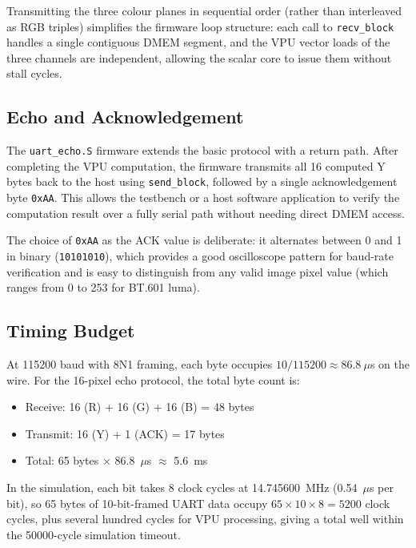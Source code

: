Transmitting the three colour planes in sequential order (rather than interleaved as
RGB triples) simplifies the firmware loop structure: each call to \texttt{recv\_block}
handles a single contiguous DMEM segment, and the VPU vector loads of the three channels
are independent, allowing the scalar core to issue them without stall cycles.

\subsection{Echo and Acknowledgement}

The \texttt{uart\_echo.S} firmware extends the basic protocol with a return path. After
completing the VPU computation, the firmware transmits all 16 computed Y bytes back to
the host using \texttt{send\_block}, followed by a single acknowledgement byte
\texttt{0xAA}. This allows the testbench or a host software application to verify
the computation result over a fully serial path without needing direct DMEM access.

The choice of \texttt{0xAA} as the ACK value is deliberate: it alternates between 0 and
1 in binary (\texttt{10101010}), which provides a good oscilloscope pattern for baud-rate
verification and is easy to distinguish from any valid image pixel value (which ranges
from 0 to 253 for BT.601 luma).

\subsection{Timing Budget}

At 115200 baud with 8N1 framing, each byte occupies $10/115200 \approx 86.8~\mu$s on
the wire. For the 16-pixel echo protocol, the total byte count is:

\begin{itemize}
  \item Receive: 16 (R) + 16 (G) + 16 (B) = 48 bytes
  \item Transmit: 16 (Y) + 1 (ACK) = 17 bytes
  \item Total: 65 bytes $\times$ 86.8~$\mu$s $\approx$ 5.6~ms
\end{itemize}

In the simulation, each bit takes 8 clock cycles at 14.745600~MHz (0.54~$\mu$s per bit),
so 65 bytes of 10-bit-framed UART data occupy $65 \times 10 \times 8 = 5200$ clock
cycles, plus several hundred cycles for VPU processing, giving a total well within the
50000-cycle simulation timeout.

